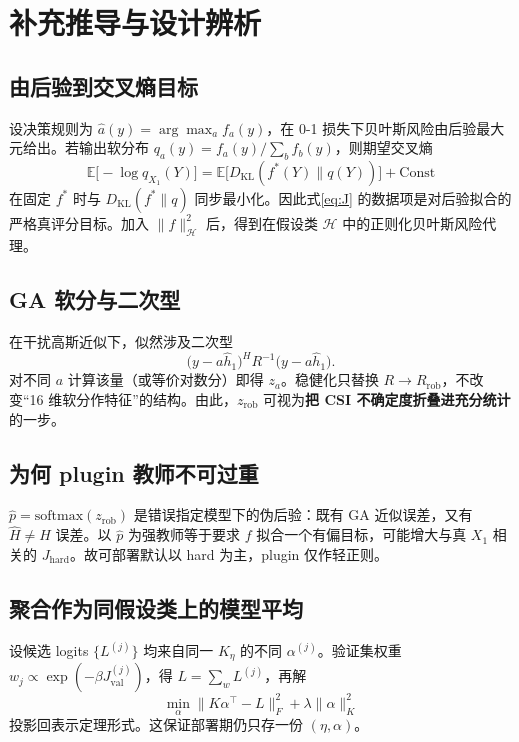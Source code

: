 \chapter{补充推导与设计辨析}
\label{ch:deriv}

\section{由后验到交叉熵目标}

设决策规则为 $\hat a(y)=\arg\max_a f_a(y)$，在 0-1 损失下贝叶斯风险由后验最大元给出。若输出软分布 $q_a(y)=f_a(y)/\sum_b f_b(y)$，则期望交叉熵
\begin{equation}
\mathbb{E}\big[-\log q_{X_1}(Y)\big]
=\mathbb{E}\big[D_{\mathrm{KL}}(f^*(Y)\|q(Y))\big]+\mathrm{Const}
\end{equation}
在固定 $f^*$ 时与 $D_{\mathrm{KL}}(f^*\|q)$ 同步最小化。因此式\eqref{eq:J} 的数据项是对后验拟合的严格真评分目标。加入 $\|f\|_{\mathcal{H}}^2$ 后，得到在假设类 $\mathcal{H}$ 中的正则化贝叶斯风险代理。

\section{GA 软分与二次型}

在干扰高斯近似下，似然涉及二次型
\begin{equation}
\big(y-a\hat h_1\big)^H R^{-1}\big(y-a\hat h_1\big).
\end{equation}
对不同 $a$ 计算该量（或等价对数分）即得 $z_a$。稳健化只替换 $R\to R_{\mathrm{rob}}$，不改变“16 维软分作特征”的结构。由此，$z_{\mathrm{rob}}$ 可视为\textbf{把 CSI 不确定度折叠进充分统计}的一步。

\section{为何 plugin 教师不可过重}

$\hat p=\mathrm{softmax}(z_{\mathrm{rob}})$ 是错误指定模型下的伪后验：既有 GA 近似误差，又有 $\hat H\neq H$ 误差。以 $\hat p$ 为强教师等于要求 $f$ 拟合一个有偏目标，可能增大与真 $X_1$ 相关的 $J_{\mathrm{hard}}$。故可部署默认以 hard 为主，plugin 仅作轻正则。

\section{聚合作为同假设类上的模型平均}

设候选 logits $\{L^{(j)}\}$ 均来自同一 $K_\eta$ 的不同 $\alpha^{(j)}$。验证集权重 $w_j\propto \exp(-\beta J_{\mathrm{val}}^{(j)})$，得 $L=\sum_w L^{(j)}$，再解
\begin{equation}
\min_\alpha \|K\alpha^\top-L\|_F^2+\lambda\|\alpha\|^2_K
\end{equation}
投影回表示定理形式。这保证部署期仍只存一份 $(\eta,\alpha)$。

